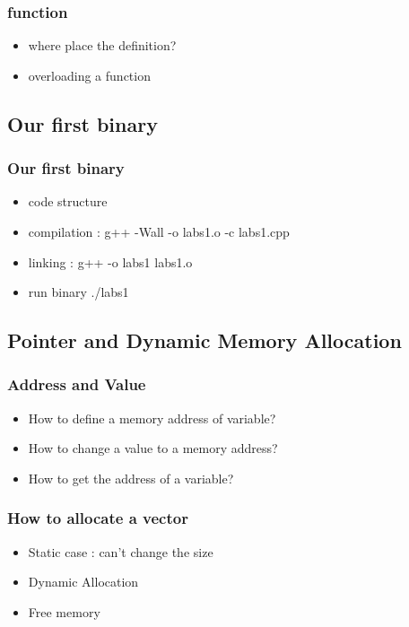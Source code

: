 \documentclass{beamer}
\begin{document}
\begin{frame}
  \frametitle{function}
	\begin{itemize}
		\item where place the definition?
		\item overloading a function
	\end{itemize}
\end{frame}

\subsection{Our first binary}
\label{sub:first_programm}

\begin{frame}
  \frametitle{Our first binary}
	\begin{itemize}
		\item code structure
		\item compilation : g++  -Wall  -o labs1.o   -c labs1.cpp
		\item linking : g++ -o labs1  labs1.o
		\item run binary ./labs1
	\end{itemize}
\end{frame}

\subsection{Pointer and Dynamic Memory Allocation}
\label{sub:pointer_and_dynamic_memory_allocation}

\begin{frame}
  \frametitle{Address and Value}
	\begin{itemize}
		\item How to define a memory address of variable?
		\item How to change a value to a memory address?
		\item How to get the address of a variable?
	\end{itemize}
\end{frame}

\begin{frame}
  \frametitle{How to allocate a vector}
	\begin{itemize}
		\item Static case : can't change the size
		\item Dynamic Allocation
		\item Free memory
	\end{itemize}
\end{frame}
\end{document}
